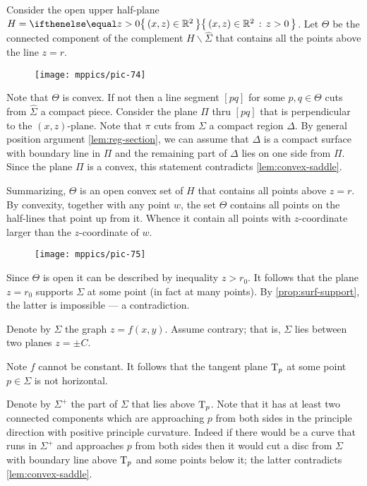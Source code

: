 Consider the open upper half-plane $H=\set{(x,z)\in \RR^2}{z> 0}$. 
Let $\Theta$ be the connected component of the complement $H\backslash \hat \Sigma$ that contains all the points above the line $z=r$.

\begin{figure}[h!]
\vskip-0mm
\centering
\texttt{[image: mppics/pic-74]}
\vskip0mm
\end{figure}

Note that $\Theta$ is convex.
If not then a line segment $[pq]$ for some $p,q\in \Theta$ cuts from $\hat\Sigma$ a compact piece.
Consider the plane $\Pi$ thru $[pq]$ that is perpendicular to the $(x,z)$-plane.
Note that $\pi$ cuts from $\Sigma$ a compact region $\Delta$.
By general position argument \ref{lem:reg-section}, 
we can assume that $\Delta$ is a compact surface with boundary line in $\Pi$ and the remaining part of $\Delta$ lies on one side from $\Pi$.
Since the plane $\Pi$ is a convex, this statement contradicts \ref{lem:convex-saddle}.

Summarizing, $\Theta$ is an open convex set of $H$ that contains all points above $z=r$.
By convexity, together with any point $w$, the set $\Theta$ contains all points on the half-lines that point up from it. 
Whence it contain all points with $z$-coordinate larger than the $z$-coordinate of $w$.
\begin{figure}[h!]
\vskip-0mm
\centering
\texttt{[image: mppics/pic-75]}
\vskip0mm
\end{figure}
Since $\Theta$ is open it can be described by inequality $z>r_0$.
It follows that the plane $z=r_0$ supports $\Sigma$ at some point (in fact at many points).
By \ref{prop:surf-support}, the latter is impossible --- a contradiction.
\qeds

Denote by $\Sigma$ the graph $z=f(x,y)$.
Assume contrary; that is, $\Sigma$ lies between two planes $z=\pm C$.

Note $f$ cannot be constant.
It follows that the tangent plane $\mathrm{T}_p$ at some point $p\in\Sigma$ is not horizontal.

Denote by $\Sigma^+$ the part of $\Sigma$ that lies above $\mathrm{T}_p$.
Note that it has at least two connected components which are approaching $p$ from both sides 
in the principle direction with positive principle curvature.
Indeed if there would be a curve that runs in $\Sigma^+$ and approaches $p$ from both sides then it would cut a disc from $\Sigma$ with boundary line above $\mathrm{T}_p$ and some points below it;
the latter contradicts \ref{lem:convex-saddle}.

